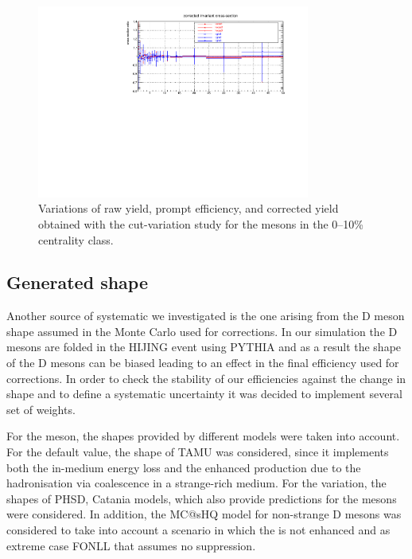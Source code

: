 \begin{figure}[tb]
\begin{center}
 \includegraphics[width=0.8\textwidth]{figures/Dstar/pp13TeV/corrected-yield-ratio-cut-var-v2.pdf}
\caption{Variations of raw yield, prompt  efficiency, and corrected yield obtained with the cut-variation study for the \Dstar mesons in the 0--10\% centrality class.}
\label{fig:DstarCutVar010}
\end{center}
\end{figure}


\clearpage
\subsection{Generated \pt shape}
\label{sec:gen_pt_syst}
Another source of systematic we investigated is the one arising from the D meson \pt shape assumed in the Monte Carlo used for corrections. In our simulation the D mesons are folded in the HIJING event using PYTHIA and as a result the \pt shape of the D mesons can be biased leading to an effect in the final efficiency used for corrections. In order to check the stability of our efficiencies against the change in \pt shape and to define a systematic uncertainty it was decided to implement several set of weights. 

For the \Dsubs meson, the \pt shapes provided by different models were taken into account. For the default value, the \pt shape of TAMU was considered, since it implements both the in-medium energy loss and the enhanced \Dsubs production due to the hadronisation via coalescence in a strange-rich medium. For the variation, the shapes of PHSD, Catania models, which also provide predictions for the \Dsubs mesons were considered. In addition, the MC@sHQ model for non-strange D mesons was considered to take into account a scenario in which the \Dsubs is not enhanced and as extreme case FONLL that assumes no suppression. 

